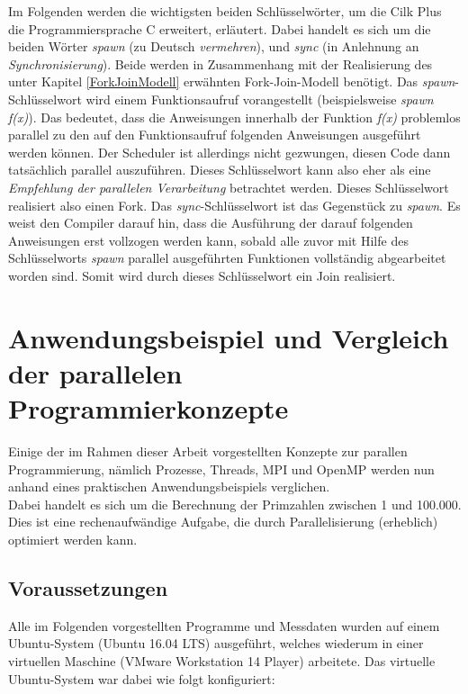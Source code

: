 			Im Folgenden werden die wichtigsten beiden Schlüsselwörter, um die Cilk Plus die Programmiersprache C erweitert, erläutert. Dabei handelt es sich um die beiden Wörter \textit{spawn} (zu Deutsch \textit{vermehren}), und \textit{sync} (in Anlehnung an \textit{Synchronisierung}). Beide werden in Zusammenhang mit der Realisierung des unter Kapitel \ref{ForkJoinModell} erwähnten Fork-Join-Modell benötigt. Das \textit{spawn}-Schlüsselwort wird einem Funktionsaufruf vorangestellt (beispielsweise \textit{spawn f(x)}). Das bedeutet, dass die Anweisungen innerhalb der Funktion \textit{f(x)} problemlos parallel zu den auf den Funktionsaufruf folgenden Anweisungen ausgeführt werden können. Der Scheduler ist allerdings nicht gezwungen, diesen Code dann tatsächlich parallel auszuführen. Dieses Schlüsselwort kann also eher als eine \textit{Empfehlung der parallelen Verarbeitung} betrachtet werden. Dieses Schlüsselwort realisiert also einen Fork. Das \textit{sync}-Schlüsselwort ist das Gegenstück zu \textit{spawn}. Es weist den Compiler darauf hin, dass die Ausführung der darauf folgenden Anweisungen erst vollzogen werden kann, sobald alle zuvor mit Hilfe des Schlüsselworts \textit{spawn} parallel ausgeführten Funktionen vollständig abgearbeitet worden sind. Somit wird durch dieses Schlüsselwort ein Join realisiert. \cite{CilkWikipedia}

	\section{Anwendungsbeispiel und Vergleich der parallelen Programmierkonzepte}

		Einige der im Rahmen dieser Arbeit vorgestellten Konzepte zur parallen Programmierung, nämlich Prozesse, Threads, MPI und OpenMP werden nun anhand eines praktischen Anwendungsbeispiels verglichen.\\
		Dabei handelt es sich um die Berechnung der Primzahlen zwischen 1 und 100.000. Dies ist eine rechenaufwändige Aufgabe, die durch Parallelisierung (erheblich) optimiert werden kann.
		
		\subsection{Voraussetzungen}
			
			Alle im Folgenden vorgestellten Programme und Messdaten wurden auf einem Ubuntu-System (Ubuntu 16.04 LTS) ausgeführt, welches wiederum in einer virtuellen Maschine (VMware Workstation 14 Player) arbeitete. Das virtuelle Ubuntu-System war dabei wie folgt konfiguriert:
			

